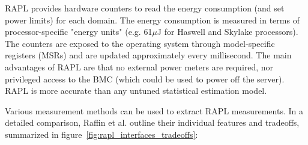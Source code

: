 RAPL provides hardware counters to read the energy consumption (and set power limits) for each domain. The energy consumption is measured in terms of processor-specific "energy units" (e.g. 61$\mu$J for Haswell and Skylake processors). The counters are exposed to the operating system through model-specific registers (MSRs) and are updated approximately every millisecond. The main advantages of RAPL are that no external power meters are required, nor privileged access to the BMC (which could be used to power off the server). RAPL is more accurate than any untuned statistical estimation model.

Various measurement methods can be used to extract RAPL measurements. In a detailed comparison, Raffin et al.\parencite{raffin2024dissecting} outline their individual features and tradeoffs, summarized in figure~\ref{fig:rapl_interfaces_tradeoffs}:
